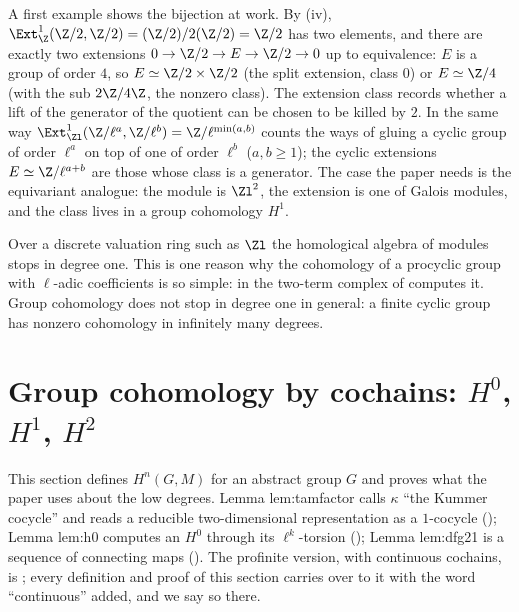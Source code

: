 A first example shows the bijection at work. By (iv), $\Ext^1_\Z(\Z/2,\Z/2)=(\Z/2)/2(\Z/2)=\Z/2$ has two elements, and there are
exactly two extensions $0\to\Z/2\to E\to\Z/2\to0$ up to equivalence: $E$ is a group of order $4$, so $E\simeq\Z/2\times\Z/2$ (the split extension, class $0$) or
$E\simeq\Z/4$ (with the sub $2\Z/4\Z$, the nonzero class). The extension class records whether a lift of the generator of the quotient can be chosen to be
killed by $2$. In the same way $\Ext^1_{\Zl}(\Z/\ell^a,\Z/\ell^b)=\Z/\ell^{\min(a,b)}$ counts the ways of gluing a cyclic group of order $\ell^a$ on top of one of
order $\ell^b$ ($a,b\ge1$); the cyclic extensions $E\simeq\Z/\ell^{a+b}$ are those whose class is a generator. The case the paper needs is the
equivariant analogue: the module is $\Zl^2$, the extension is one of Galois modules, and the class lives in a group cohomology $H^1$.

\begin{remark}\label{rem:cohomology:dvr-degree-one}
Over a discrete valuation ring such as $\Zl$ the homological algebra of modules stops in degree one. This is one reason why the cohomology of a
procyclic group with $\ell$-adic coefficients is so simple: in  the two-term complex of 
computes it. Group cohomology does not stop in degree one in general: a finite cyclic group has nonzero cohomology in infinitely many degrees.
\end{remark}

\section[Group cohomology by cochains]{Group cohomology by cochains: $H^0$, $H^1$, $H^2$}\label{sec:cohomology:cochains}

This section defines $H^n(G,M)$ for an abstract group $G$ and proves what the paper uses about the low degrees. Lemma lem:tamfactor calls $\kappa$
``the Kummer cocycle'' and reads a reducible two-dimensional representation as a $1$-cocycle (); Lemma lem:h0 computes an
$H^0$ through its $\ell^k$-torsion (); Lemma lem:dfg21 is a sequence of connecting maps
(). The profinite version, with continuous cochains, is ; every definition and proof of this
section carries over to it with the word ``continuous'' added, and we say so there.

